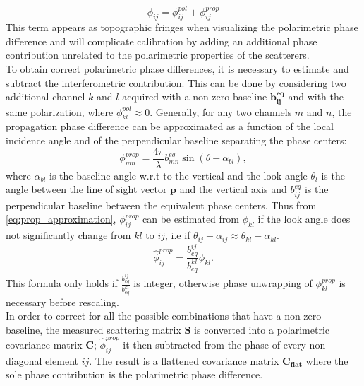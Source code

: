 \begin{equation}
	\phi_{ij} = \phi_{ij}^{pol} + \phi_{ij}^{prop}
\end{equation}
This term appears as topographic fringes when visualizing the polarimetric phase difference and will complicate calibration by adding an additional phase contribution unrelated to the polarimetric properties of the scatterers.\\
To obtain correct polarimetric phase differences, it is necessary to estimate and subtract the interferometric contribution. This can be done  by considering two additional channel $k$ and $l$  acquired with  a non-zero baseline $\mathbf{b_{ij}^{eq}}$ and with the same polarization, where $\phi_{kl}^{pol} \approx 0$. Generally, for any two channels $m$ and $n$,  the propagation phase difference can be approximated as a function of the local incidence angle and of the perpendicular baseline separating the phase centers:
\begin{equation}\label{eq:prop_approximation}
		\phi_{mn}^{prop} = \frac{4\pi}{\lambda} b_{mn}^{eq} \sin(\theta - \alpha_{bl}),
\end{equation}
where $\alpha_{bl}$ is the baseline angle w.r.t to the vertical and the look angle $\theta_l$ is the angle between the line of sight vector $\mathbf{p}$ and the vertical axis and $b_{ij}^{eq}$ is the perpendicular baseline between the equivalent phase centers.
Thus from \autoref{eq:prop_approximation}, $\phi_{ij}^{prop}$ can be estimated from $\phi_{kl}$ if the look angle does not significantly change from $kl$ to $ij$, i.e if $\theta_{ij} - \alpha_{ij} \approx \theta_{kl} - \alpha_{kl}$. 
\begin{equation}
	\hat{\phi}_{ij}^{prop} = \frac{b_{eq}^{ij}}{b_{eq}^{kl}} \phi_{kl}.
\end{equation}
This formula only holds if $\frac{b_{eq}^{ij}}{b_{eq}^{kl}}$ is integer\cite{Massonnet1996}, otherwise phase unwrapping of $\phi_{kl}^{prop}$ is necessary before rescaling.\\
In order to correct for all the possible combinations that have a non-zero baseline, the measured scattering matrix $\mathbf{S}$ is converted into a polarimetric covariance matrix $\mathbf{C}$;  $\hat{\phi}_{ij}^{prop}$ it then subtracted from the phase of every non-diagonal element $ij$. The result is a flattened covariance matrix $\mathbf{C_{flat}}$ where the sole phase contribution is the polarimetric phase difference.\\

